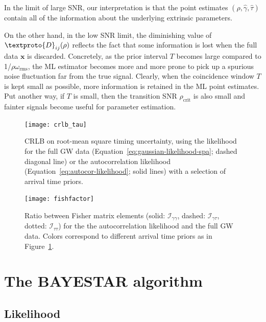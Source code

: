 \documentclass{iopart}
\begin{document}
In the limit of large SNR, our interpretation is that the point estimates $(\hat\rho, \hat\gamma, \hat\tau)$ contain all of the information about the underlying extrinsic parameters.

On the other hand, in the low SNR limit, the diminishing value of $\textproto{D}_{ij}(\rho)$ reflects the fact that some information is lost when the full data $\mathbf{x}$ is discarded. Concretely, as the prior interval $T$ becomes large compared to 1/$\rho\omega_\mathrm{rms}$, the ML estimator becomes more and more prone to pick up a spurious noise fluctuation far from the true signal. Clearly, when the coincidence window $T$ is kept small as possible, more information is retained in the ML point estimates. Put another way, if $T$ is small, then the transition SNR $\rho_\mathrm{crit}$ is also small and fainter signals become useful for parameter estimation.

\begin{figure}
    \begin{center}
        \texttt{[image: crlb\_tau]}
    \end{center}
    \caption{\label{fig:crlb-tau}\ac{CRLB} on root\nobreakdashes-mean square timing uncertainty, using the likelihood for the full GW data (Equation~\ref{eq:gaussian-likelihood-spa}; dashed diagonal line) or the autocorrelation likelihood (Equation~\ref{eq:autocor-likelihood}; solid lines) with a selection of arrival time priors.}
\end{figure}

\begin{figure}
    \begin{center}
        \texttt{[image: fishfactor]}
    \end{center}
    \caption{\label{fig:fishfactor}Ratio between Fisher matrix elements (solid: $\mathcal{I}_{\gamma\gamma}$, dashed: $\mathcal{I}_{\gamma\tau}$, dotted: $\mathcal{I}_{\tau\tau}$) for the the autocorrelation likelihood and the full GW data. Colors correspond to different arrival time priors as in Figure~\ref{fig:crlb-tau}.}
\end{figure}

\section{The \ac{BAYESTAR} algorithm}

\subsection{Likelihood}
\end{document}
